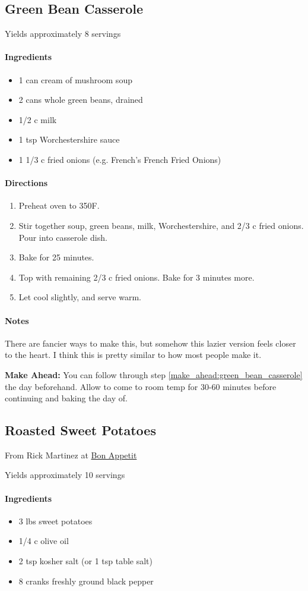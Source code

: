 \documentclass[12pt]{article}
\newenvironment*{ingredients}
	{
		\paragraph*{Ingredients}
		\begin{itemize}
	}
	{
		\end{itemize}
	}
\newenvironment*{directions}
	{
		\paragraph*{Directions}
		\begin{enumerate}
	}
	{
		\end{enumerate}
	}
\newenvironment*{notes}
	{
		\paragraph*{Notes}
		\begin{adjustwidth}{1cm}{}
	}
	{
		\end{adjustwidth}
	}
\begin{document}
	\newpage
	
	\subsection{Green Bean Casserole}
	Yields approximately 8 servings
	
	\begin{ingredients}
		\item 1 can cream of mushroom soup
		\item 2 cans whole green beans, drained
		\item 1/2 c milk
		\item 1 tsp Worchestershire sauce
		\item 1 1/3 c fried onions (e.g. French's French Fried Onions)
	\end{ingredients}
	
	\begin{directions}
		\item Preheat oven to 350F.
		\item Stir together soup, green beans, milk, Worchestershire, and 2/3 c fried onions. Pour into casserole dish. \label{make_ahead:green_bean_casserole}
		\item Bake for 25 minutes.
		\item Top with remaining 2/3 c fried onions. Bake for 3 minutes more.
		\item Let cool slightly, and serve warm.
	\end{directions}
	
	\begin{notes}
		There are fancier ways to make this, but somehow this lazier version feels closer to the heart. I think this is pretty similar to how most people make it.
		
		\textbf{Make Ahead:} You can follow through step \ref{make_ahead:green_bean_casserole} the day beforehand. Allow to come to room temp for 30-60 minutes before continuing and baking the day of.
	\end{notes}
	
	\newpage
	
	\subsection{Roasted Sweet Potatoes}
	From Rick Martinez at \href{https://www.bonappetit.com/recipe/roasted-sweet-potatoes}{Bon Appetit}
	
	Yields approximately 10 servings
	
	\begin{ingredients}
		\item 3 lbs sweet potatoes
		\item 1/4 c olive oil
		\item 2 tsp kosher salt (or 1 tsp table salt)
		\item 8 cranks freshly ground black pepper
	\end{ingredients}
	
\end{document}
